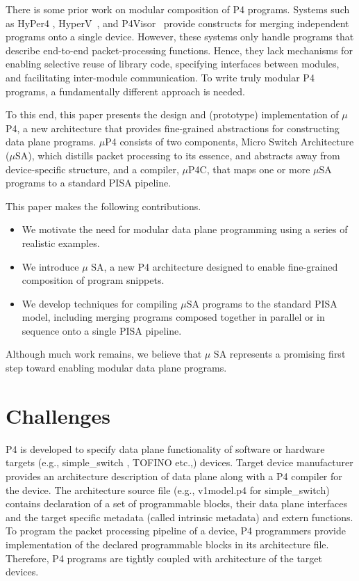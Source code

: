 \documentclass{hotnets19}
\begin{document}
There is some prior work on modular composition of P4 programs.
Systems such as HyPer4 \cite{Hancock:2016:HUP:2999572.2999607},
HyperV~\cite{8038396}, and
P4Visor~\cite{Zheng:2018:PLV:3281411.3281436} provide constructs for
merging independent programs onto a single device. However, these
systems only handle programs that describe end-to-end
packet-processing functions. Hence, they lack mechanisms for enabling
selective reuse of library code, specifying interfaces between
modules, and facilitating inter-module communication. To write truly
modular P4 programs, a fundamentally different approach is needed.

To this end, this paper presents the design and (prototype)
implementation of $\mu$P4, a new architecture that provides
fine-grained abstractions for constructing data plane programs.
$\mu$P4 consists of two components, Micro Switch Architecture
($\mu$SA), which distills packet processing to its essence, and
abstracts away from device-specific structure, and a compiler,
$\mu$P4C, that maps one or more $\mu$SA programs to a standard PISA
pipeline. 

This paper makes the following contributions.
\begin{itemize}
\item We motivate the need for modular data plane programming using a
  series of realistic examples.
\item We introduce $\mu$ SA, a new P4 architecture designed to enable
  fine-grained composition of program snippets.
\item We develop techniques for compiling $\mu$SA programs to the
  standard PISA model, including merging programs composed together in
  parallel or in sequence onto a single PISA pipeline.
\end{itemize}

Although much work remains, we believe that $\mu$ SA represents a
promising first step toward enabling modular data plane programs.

\section{Challenges}
P4 is developed to specify data plane functionality of software or hardware targets (e.g., simple\_\-switch \cite{simple_switch.md}, TOFINO \cite{tofino} etc.,) devices.
Target device manufacturer provides an architecture description of data plane along with a P4 compiler for the device.
The architecture source file (e.g., v1\-mod\-el\-.p4 \cite{v1model.p4} for simple\_switch) contains declaration of a set of pro\-gram\-ma\-ble blocks, their data plane interfaces and the target specific metadata (called intrinsic metadata) and extern functions.
To program the packet processing pipeline of a device, P4 programmers provide implementation of the declared programmable blocks in its architecture file.
Therefore, P4 programs are tightly coupled with architecture of the target devices.
\end{document}

